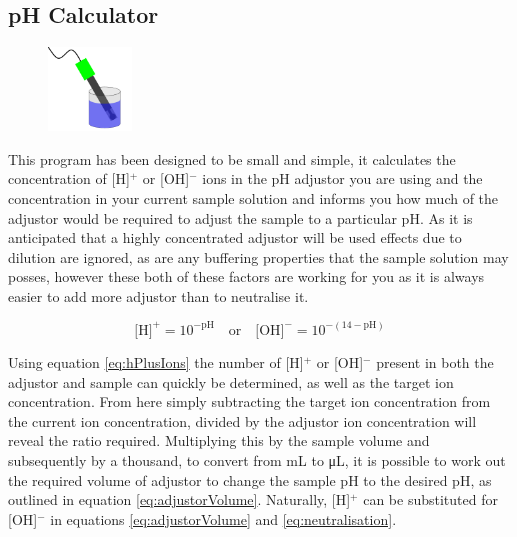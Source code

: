 \documentclass[a4paper]{article}
\begin{document}
	\pagestyle{fancy}
	\renewcommand{\headrulewidth}{0pt}
	\renewcommand{\footrulewidth}{0.4pt}
	\renewcommand{\subsectionmark}[1]{}
	\renewcommand{\sectionmark}[1]{\markboth{#1}{}}
	\rfoot{\thepage}
	\doublespacing

	\begin{centering}
 		\section*{pH Calculator}
 		\label{sec:ph_calculator}
	\end{centering} 	

		\begin{figure}[ht!]
			\centering
			\includegraphics[height=6em]{Graphics/phIcon}
		\end{figure}

		\noindent This program has been designed to be small and simple, it calculates the concentration of [H]$^{+}$ or [OH]$^{-}$ ions in the pH adjustor you are using and the concentration in your current sample solution and informs you how much of the adjustor would be required to adjust the sample to a particular pH. As it is anticipated that a highly concentrated adjustor will be used effects due to dilution are ignored, as are any buffering properties that the sample solution may posses, however these both of these factors are working for you as it is always easier to add more adjustor than to neutralise it.

		\begin{equation}
			\text{[H]}^{+} = 10^{-\text{pH}} \quad \text{or} \quad \text{[OH]}^{-} = 10^{-(14-\text{pH})}
			\label{eq:hPlusIons}
		\end{equation}

		\noindent Using equation \ref{eq:hPlusIons} the number of [H]$^{+}$ or [OH]$^{-}$ present in both the adjustor and sample can quickly be determined, as well as the target ion concentration. From here simply subtracting the target ion concentration from the current ion concentration, divided by the adjustor ion concentration will reveal the ratio required. Multiplying this by the sample volume and subsequently by a thousand, to convert from \si{\milli\liter} to \si{\micro\liter}, it is possible to work out the required volume of adjustor to change the sample pH to the desired pH, as outlined in equation \ref{eq:adjustorVolume}. Naturally, [H]$^{+}$ can be substituted for [OH]$^{-}$ in equations \ref{eq:adjustorVolume} and \ref{eq:neutralisation}.
\end{document}
